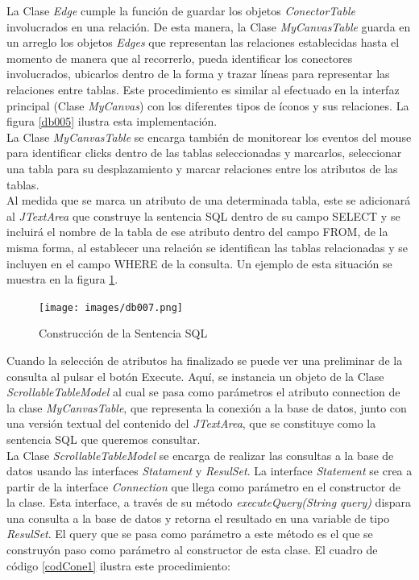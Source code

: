 La Clase \textit{Edge} cumple la funci\'on de guardar los objetos \textit{ConectorTable} involucrados en una
relaci\'on.  De esta manera, la Clase \textit{MyCanvasTable} guarda en un arreglo los objetos \textit{Edges} que
representan las relaciones establecidas hasta el momento de manera que al recorrerlo, pueda identificar los
conectores involucrados, ubicarlos dentro de la forma y trazar l\'ineas para representar las relaciones entre
tablas.  Este procedimiento es similar al efectuado en la interfaz principal (Clase \textit{MyCanvas}) con los
diferentes tipos de \'iconos y sus relaciones.  La figura \ref{db005} ilustra esta implementaci\'on.\\

La Clase \textit{MyCanvasTable} se encarga tambi\'en de monitorear los eventos del mouse para identificar clicks
dentro de las tablas seleccionadas y marcarlos, seleccionar una tabla para su desplazamiento y marcar relaciones
entre los atributos de las tablas.\\

Al medida que se marca un atributo de una determinada tabla, este se adicionar\'a al \textit{JTextArea} que
construye la sentencia SQL dentro de su campo SELECT y se incluir\'a el nombre de la tabla de ese atributo dentro
del campo FROM, de la misma forma, al establecer una relaci\'on se identifican las tablas relacionadas y se
incluyen en el campo WHERE de la consulta.  Un ejemplo de esta situaci\'on se muestra en la figura \ref{db007}.\\

\begin{figure}[!h]
\centering
\texttt{[image: images/db007.png]}
\caption{Construcci\'on de la Sentencia SQL}
\label{db007}
\end{figure}

Cuando la selecci\'on de atributos ha finalizado se puede ver una preliminar de la consulta al pulsar el bot\'on
Execute.  Aqu\'i, se instancia un objeto de la Clase \textit{ScrollableTableModel} al cual se pasa como
par\'ametros el atributo connection de la clase \textit{MyCanvasTable}, que representa la conexi\'on a la base de
datos, junto con una versi\'on textual del contenido del \textit{JTextArea}, que se constituye como la sentencia
SQL que queremos consultar.\\

La Clase \textit{ScrollableTableModel} se encarga de realizar las consultas a la base de datos usando las
interfaces \textit{Statament} y \textit{ResulSet}.  La interface \textit{Statement} se crea a partir de la interface
\textit{Connection} que llega como par\'ametro en el constructor de la clase.  Esta interface, a trav\'es de su
m\'etodo \textit{executeQuery(String query)} dispara una consulta a la base de datos y retorna el resultado en una
variable de tipo \textit{ResulSet}.  El query que se pasa como par\'ametro a este m\'etodo es el que se construy\'on%
paso como par\'ametro al constructor de esta clase.  El cuadro de c\'odigo \ref{codCone1} ilustra
este procedimiento:\\

